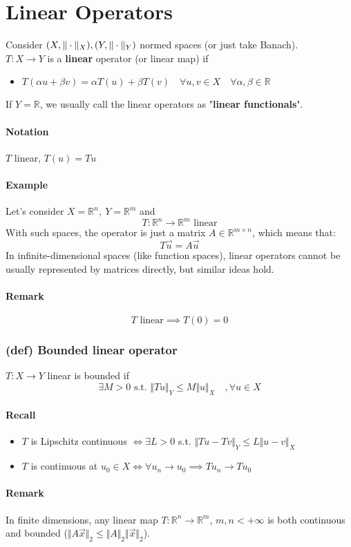 \section{Linear Operators}
Consider $(X,\Vert \cdot \Vert_X), (Y,\Vert \cdot \Vert_Y)$ normed spaces (or just take Banach). \\
$T:X\to Y$ is a \textbf{linear} operator (or linear map) if
\begin{itemize}
    \item $T(\alpha u +\beta v)=\alpha T(u)+\beta T(v)\quad \forall u,v\in X\quad \forall \alpha,\beta \in \mathbb R$
\end{itemize}
If $Y=\mathbb R$, we usually call the linear operators as "\textbf{linear functionals}".
\paragraph{Notation}
$T$ linear, $T(u)=Tu$
\paragraph{Example}
Let's consider $X=\mathbb R^n,\ Y=\mathbb R^m$ and
$$T:\mathbb R^n\to \mathbb R^m \text{ linear}$$
With such spaces, the operator is just a matrix $A\in \mathbb R^{m\times n}$, which means that:
$$T \vec{u}=A \vec{u}$$
In infinite-dimensional spaces (like function spaces), linear operators cannot be usually represented by matrices directly, but similar ideas hold.
\paragraph{Remark}
$$T\text{ linear}\implies T(0)=0$$
\subsubsection{(def) Bounded linear operator}
$T:X\to Y$ linear is bounded if
$$\exists M>0 \text{ s.t. }\Vert Tu\Vert _Y\leq M\Vert u\Vert _X\quad ,\forall u\in X$$
\paragraph{Recall}
\begin{itemize}
    \item $T$ is Lipschitz continuous  $\iff\exists L>0$ s.t. $\Vert Tu-Tv\Vert_Y\leq L\Vert u-v\Vert _X$
    \item $T$ is continuous at $u_0\in X \iff \forall u_n\to u_0\implies T u_n\to T u_0$
\end{itemize}
\paragraph{Remark}
In finite dimensions, any linear map $T:\mathbb R^n\to\mathbb R^m$, $m,n<+\infty$ is both continuous and bounded ($\Vert A\vec x\Vert_2\leq \Vert A\Vert _2\Vert \vec x\Vert _2$).
